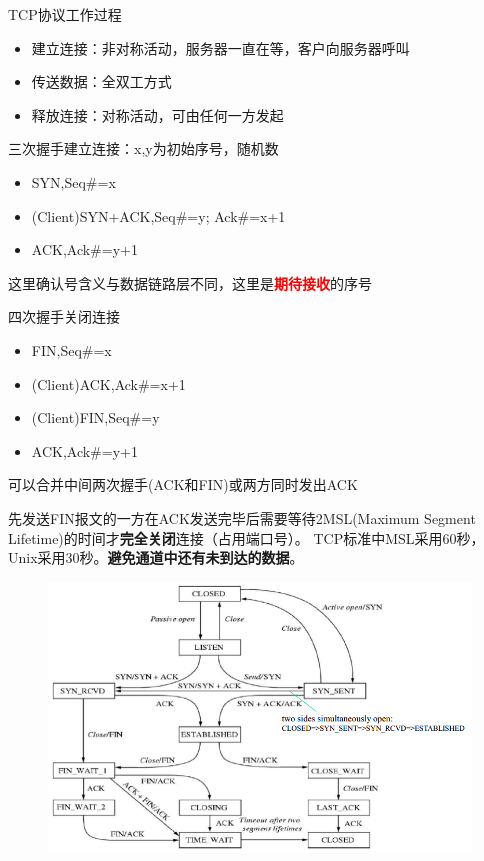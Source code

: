 TCP协议工作过程
\begin{center}
\end{center}
\begin{itemize}
    \item 建立连接：非对称活动，服务器一直在等，客户向服务器呼叫
    \item 传送数据：全双工方式
    \item 释放连接：对称活动，可由任何一方发起
\end{itemize}

三次握手建立连接：x,y为初始序号，随机数
\begin{itemize}
    \item SYN,Seq\#=x
    \item (Client)SYN+ACK,Seq\#=y; Ack\#=x+1
    \item ACK,Ack\#=y+1
\end{itemize}
这里确认号含义与数据链路层不同，这里是\textcolor{red}{\textbf{期待接收}}的序号

四次握手关闭连接
\begin{itemize}
    \item FIN,Seq\#=x
    \item (Client)ACK,Ack\#=x+1
    \item (Client)FIN,Seq\#=y
    \item ACK,Ack\#=y+1
\end{itemize}
可以合并中间两次握手(ACK和FIN)或两方同时发出ACK

先发送FIN报文的一方在ACK发送完毕后需要等待2MSL(Maximum Segment Lifetime)的时间才\textbf{完全关闭}连接（占用端口号）。 TCP标准中MSL采用60秒， Unix采用30秒。\textbf{避免通道中还有未到达的数据}。
\begin{figure}[H]
    \centering
    \includegraphics[width=0.8\linewidth]{fig/TCP-transition.PNG}
\end{figure}

